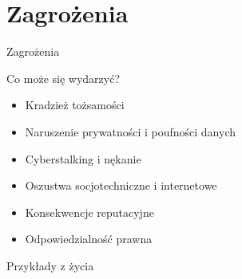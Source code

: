 \section{Zagrożenia}
\begin{frame}{Zagrożenia}
    \begin{block}{Co może się wydarzyć?}
    \begin{itemize}
      \item Kradzież tożsamości
      \item Naruszenie prywatności i poufności danych
      \item Cyberstalking i nękanie
      \item Oszustwa socjotechniczne i internetowe
      \item Konsekwencje reputacyjne
      \item Odpowiedzialność prawna
    \end{itemize}
    \end{block}
\end{frame}

\begin{frame}{}
  \begin{center}
    {\huge Przykłady z życia}
  \end{center}
\end{frame}

